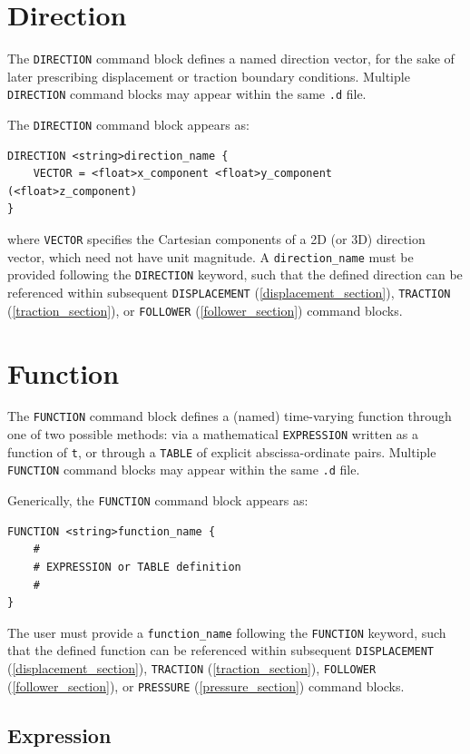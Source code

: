 \documentclass[11pt]{article} %
\begin{document}
\section{Direction} The \texttt{DIRECTION} command block defines a named direction vector, for the sake of later prescribing displacement or traction boundary conditions. Multiple \texttt{DIRECTION} command blocks may appear within the same \texttt{.d} file.

The \texttt{DIRECTION} command block appears as:
\begin{lstlisting}
DIRECTION <string>direction_name {
	VECTOR = <float>x_component <float>y_component (<float>z_component)
}
\end{lstlisting}
where \texttt{VECTOR} specifies the Cartesian components of a 2D (or 3D) direction vector, which need not have unit magnitude. A \texttt{direction\_name} must be provided following the \texttt{DIRECTION} keyword, such that the defined direction can be referenced within subsequent \texttt{DISPLACEMENT} (\ref{displacement_section}), \texttt{TRACTION} (\ref{traction_section}), or \texttt{FOLLOWER} (\ref{follower_section}) command blocks.

\section{Function} The \texttt{FUNCTION} command block defines a (named) time-varying function through one of two possible methods: via a mathematical \texttt{EXPRESSION} written as a function of \texttt{t}, or through a \texttt{TABLE} of explicit abscissa-ordinate pairs. Multiple \texttt{FUNCTION} command blocks may appear within the same \texttt{.d} file.

Generically, the \texttt{FUNCTION} command block appears as:
\begin{lstlisting}
FUNCTION <string>function_name {
	#
	# EXPRESSION or TABLE definition
	#
}
\end{lstlisting}
The user must provide a \texttt{function\_name} following the \texttt{FUNCTION} keyword, such that the defined function can be referenced within subsequent \texttt{DISPLACEMENT} (\ref{displacement_section}), \texttt{TRACTION} (\ref{traction_section}), \texttt{FOLLOWER} (\ref{follower_section}), or \texttt{PRESSURE} (\ref{pressure_section}) command blocks.

\subsection{Expression} 
\end{document}

